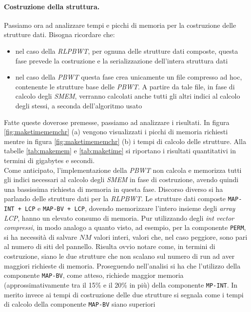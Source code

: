 \paragraph{Costruzione della struttura.}
Passiamo ora ad analizzare tempi e picchi di memoria per la costruzione delle
strutture dati. Bisogna ricordare che:
\begin{itemize}
  \item nel caso della \textit{RLPBWT}, per ognuna delle strutture dati
  composte, questa fase prevede la costruzione e la 
  serializzazione dell'intera struttura dati
  \item nel caso della \textit{PBWT} questa fase crea unicamente un file
  compresso ad hoc, contenente le strutture base delle \textit{PBWT}. A partire
  da tale file, in fase di calcolo degli \textit{SMEM}, verranno calcolati anche
  tutti gli altri indici al calcolo degli stessi, a seconda dell'algoritmo usato
\end{itemize}
Fatte queste doverose premesse, passiamo ad analizzare i risultati.
In figura \ref{fig:maketimememchr} (a) vengono visualizzati i picchi di
memoria richiesti mentre in figura \ref{fig:maketimememchr} (b) i tempi di
calcolo delle strutture. Alla tabelle \ref{tab:makemem} e \ref{tab:maketime} si
riportano i risultati quantitativi in termini di gigabytes e secondi.\\ 
Come anticipato, l'implementazione della \textit{PBWT} non calcola e memorizza
tutti gli indici 
necessari al calcolo degli \textit{SMEM} in fase di costruzione, avendo quindi
una bassissima richiesta di memoria in questa fase. Discorso diverso si ha
parlando delle strutture dati per la \textit{RLPBWT}. Le strutture dati composte
\texttt{MAP-INT + LCP} e \texttt{MAP-BV + LCP}, dovendo 
memorizzare l'intero insieme degli \textit{array LCP}, hanno un elevato
consumo di memoria. Pur utilizzando degli \textit{int vector compressi}, in modo
analogo a quanto visto, ad esempio, per la componente \texttt{PERM}, si ha
necessità di salvare $NM$ valori interi, valori che, nel caso peggiore, sono
pari al numero di siti del pannello. Risulta ovvio notare come, in
termini di costruzione, siano le due strutture che non scalano sul numero di run
ad aver maggiori richieste di memoria. Proseguendo nell'analisi si ha che
l'utilizzo della componente 
\texttt{MAP-BV}, come atteso, richiede maggior memoria (approssimativamente tra
il 15\% e il 20\% in più) della componente
\texttt{MP-INT}. In merito invece ai tempi di costruzione delle due strutture si
segnala come i tempi di calcolo della componente \texttt{MAP-BV} siano superiori
